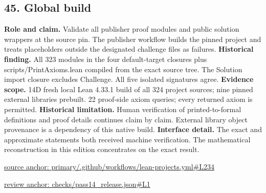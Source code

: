 \documentclass[11pt,letterpaper]{article}
\theoremstyle{definition}\newtheorem{definition}[theorem]{Definition}\newtheorem{example}[theorem]{Example}
\theoremstyle{remark}\newtheorem{remark}[theorem]{Remark}
\begin{document}
\subsection*{45. Global build}
\textbf{Role and claim.} Validate all publisher proof modules and public solution wrappers at the source pin. The publisher workflow builds the pinned project and treats placeholders outside the designated challenge files as failures.
\textbf{Historical finding.} All 323 modules in the four default-target closures plus scripts/PrintAxioms.lean compiled from the exact source tree. The Solution import closure excludes Challenge. All five isolated signatures agree.
\textbf{Evidence scope.} 14D fresh local Lean 4.33.1 build of all 324 project sources; nine pinned external libraries prebuilt. 22 proof-side axiom queries; every returned axiom is permitted.
\textbf{Historical limitation.} Human verification of printed-to-formal definitions and proof details continues claim by claim. External library object provenance is a dependency of this native build.
\textbf{Interface detail.} The exact and approximate statements both received machine verification. The mathematical reconstruction in this edition concentrates on the exact result.
\par\href{https://github.com/nousentllc/VP-VNP-Review/blob/8a7976933b6b2b4ffda1ad3a0dfb5fc6b6f023e8/primary/.github/workflows/lean-projects.yml\#L234}{source anchor: primary/.github/workflows/lean-projects.yml\#L234}
\par\href{https://github.com/nousentllc/VP-VNP-Review/blob/8a7976933b6b2b4ffda1ad3a0dfb5fc6b6f023e8/checks/pass14_release.json\#L1}{review anchor: checks/pass14\_release.json\#L1}
\goodbreak
{}
\hypertarget{claim.46}{}
\end{document}
